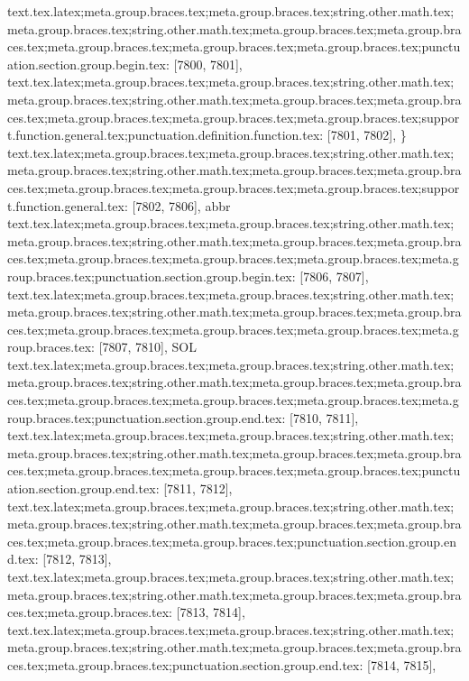 {{{{{{{{{{{{{{{{{{{{{{{{{{{{{{{{{{{{{{{{{{{{{{{{{{{{{{{{{{{{{{{{{{{{{{{{{{{{{{{{{{{{{{{{{{{{{{{{{{{{{{{{{{{{{{{{{{{{{{{{{{{{{{{{{{{{{{{{{{{{{{{{{{{{{{{{{{{{{{{{{{{{{{{{{{{{{{{{{{{{{{{{{{{{{{{{{{{{{{{{{{{{{{{{{{{{{{{{{{{{{{{{{{{{{{text.tex.latex;meta.group.braces.tex;meta.group.braces.tex;string.other.math.tex;meta.group.braces.tex;string.other.math.tex;meta.group.braces.tex;meta.group.braces.tex;meta.group.braces.tex;meta.group.braces.tex;meta.group.braces.tex;punctuation.section.group.begin.tex: [7800, 7801], {{}
text.tex.latex;meta.group.braces.tex;meta.group.braces.tex;string.other.math.tex;meta.group.braces.tex;string.other.math.tex;meta.group.braces.tex;meta.group.braces.tex;meta.group.braces.tex;meta.group.braces.tex;meta.group.braces.tex;support.function.general.tex;punctuation.definition.function.tex: [7801, 7802], {\}
text.tex.latex;meta.group.braces.tex;meta.group.braces.tex;string.other.math.tex;meta.group.braces.tex;string.other.math.tex;meta.group.braces.tex;meta.group.braces.tex;meta.group.braces.tex;meta.group.braces.tex;meta.group.braces.tex;support.function.general.tex: [7802, 7806], {abbr}
text.tex.latex;meta.group.braces.tex;meta.group.braces.tex;string.other.math.tex;meta.group.braces.tex;string.other.math.tex;meta.group.braces.tex;meta.group.braces.tex;meta.group.braces.tex;meta.group.braces.tex;meta.group.braces.tex;meta.group.braces.tex;punctuation.section.group.begin.tex: [7806, 7807], {{}
text.tex.latex;meta.group.braces.tex;meta.group.braces.tex;string.other.math.tex;meta.group.braces.tex;string.other.math.tex;meta.group.braces.tex;meta.group.braces.tex;meta.group.braces.tex;meta.group.braces.tex;meta.group.braces.tex;meta.group.braces.tex: [7807, 7810], {SOL}
text.tex.latex;meta.group.braces.tex;meta.group.braces.tex;string.other.math.tex;meta.group.braces.tex;string.other.math.tex;meta.group.braces.tex;meta.group.braces.tex;meta.group.braces.tex;meta.group.braces.tex;meta.group.braces.tex;meta.group.braces.tex;punctuation.section.group.end.tex: [7810, 7811], {}}
text.tex.latex;meta.group.braces.tex;meta.group.braces.tex;string.other.math.tex;meta.group.braces.tex;string.other.math.tex;meta.group.braces.tex;meta.group.braces.tex;meta.group.braces.tex;meta.group.braces.tex;meta.group.braces.tex;punctuation.section.group.end.tex: [7811, 7812], {}}
text.tex.latex;meta.group.braces.tex;meta.group.braces.tex;string.other.math.tex;meta.group.braces.tex;string.other.math.tex;meta.group.braces.tex;meta.group.braces.tex;meta.group.braces.tex;meta.group.braces.tex;punctuation.section.group.end.tex: [7812, 7813], {}}
text.tex.latex;meta.group.braces.tex;meta.group.braces.tex;string.other.math.tex;meta.group.braces.tex;string.other.math.tex;meta.group.braces.tex;meta.group.braces.tex;meta.group.braces.tex: [7813, 7814], { }
text.tex.latex;meta.group.braces.tex;meta.group.braces.tex;string.other.math.tex;meta.group.braces.tex;string.other.math.tex;meta.group.braces.tex;meta.group.braces.tex;meta.group.braces.tex;punctuation.section.group.end.tex: [7814, 7815], {}}
}}}}}}}}}}}}}}}}}}}}}}}}}}}}}}}}}}}}}}}}}}}}}}}}}}}}}}}}}}}}}}}}}}}}}}}}}}}}}}}}}}}}}}}}}}}}}}}}}}}}}}}}}}}}}}}}}}}}}}}}}}}}}}}}}}}}}}}}}}}}}}}}}}}}}}}}}}}}}}}}}}}}}}}}}}}}}}}}}}}}}}}}}}}}}}}}}}}}}}}}}}}}}}}}}}}}}}}}}}}}}}}}}}}}}
